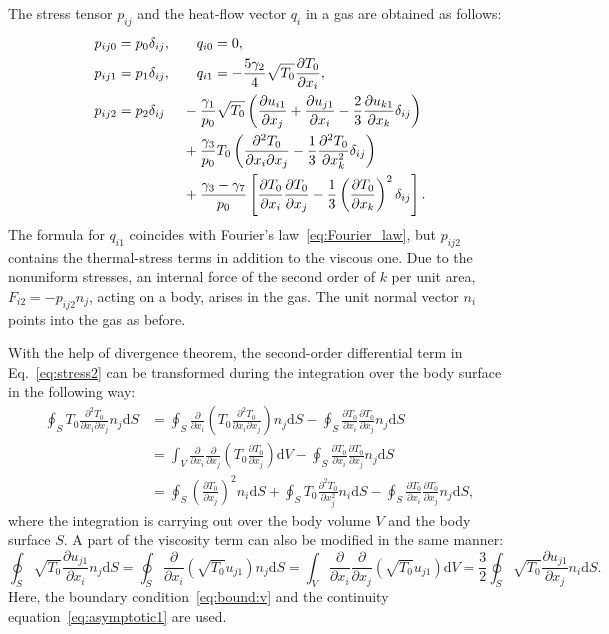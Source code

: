 \documentclass[smallextended, final]{svjour3} %
\newcommand{\dd}{\mathrm{d}}
\newcommand{\pder}[2][]{\frac{\partial#1}{\partial#2}}
\newcommand{\pderdual}[2][]{\frac{\partial^2#1}{\partial#2^2}}
\newcommand{\pderder}[3][]{\frac{\partial^2#1}{\partial#2\partial#3}}
\begin{document}
The stress tensor \(p_{ij}\) and the heat-flow vector \(q_i\) in a gas are obtained as follows:
\begin{alignat}{2}
    p_{ij0} &= p_0\delta_{ij}, && \quad q_{i0} = 0, \label{eq:stress0}\\
    p_{ij1} &= p_1\delta_{ij}, && \quad q_{i1} = -\frac{5\gamma_2}4\sqrt{T_0}\pder[T_0]{x_i}, \label{eq:stress1}\\
    p_{ij2} &= p_2\delta_{ij}
                &&- \frac{\gamma_1}{p_0}\sqrt{T_0}\left(
                \pder[u_{i1}]{x_j} + \pder[u_{j1}]{x_i} - \frac23\pder[u_{k1}]{x_k}\delta_{ij}
            \right) \notag\\
        & &&+ \frac{\gamma_3}{p_0} T_0\left(
                \pderder[T_0]{x_i}{x_j} - \frac13\pderdual[T_0]{x_k}\delta_{ij}
            \right) \notag\\
        & &&+ \frac{\gamma_3 - \gamma_7}{p_0}\left[
                \pder[T_0]{x_i}\pder[T_0]{x_j} - \frac13\left(\pder[T_0]{x_k}\right)^2\delta_{ij}
            \right]. \label{eq:stress2}
\end{alignat}
The formula for \(q_{i1}\) coincides with Fourier's law~\eqref{eq:Fourier_law},
but \(p_{ij2}\) contains the thermal-stress terms in addition to the viscous one.
Due to the nonuniform stresses, an internal force of the second order of \(k\) per unit area,
\(F_{i2} = -p_{ij2}n_j\), acting on a body, arises in the gas.
The unit normal vector \(n_i\) points into the gas as before.

With the help of divergence theorem, the second-order differential term in Eq.~\eqref{eq:stress2}
can be transformed during the integration over the body surface in the following way:
\begin{align*}
    \oint_S T_0\pderder[T_0]{x_i}{x_j} n_j\dd{S}
        &= \oint_S \pder{x_i} \left( T_0\pderder[T_0]{x_i}{x_j} \right) n_j\dd{S}
        - \oint_S \pder[T_0]{x_i}\pder[T_0]{x_j} n_j\dd{S} \\
        &= \int_V \pder{x_i}\pder{x_j} \left( T_0 \pder[T_0]{x_j} \right) \dd{V}
        - \oint_S \pder[T_0]{x_i}\pder[T_0]{x_j} n_j\dd{S} \\
        &= \oint_S \left(\pder[T_0]{x_j}\right)^2 n_i\dd{S}
        + \oint_S T_0\pderdual[T_0]{x_j} n_i\dd{S}
        - \oint_S \pder[T_0]{x_i}\pder[T_0]{x_j} n_j\dd{S},
\end{align*}
where the integration is carrying out over the body volume \(V\) and the body surface \(S\).
A part of the viscosity term can also be modified in the same manner:
\begin{equation*}
    \oint_S \sqrt{T_0}\pder[u_{j1}]{x_i} n_j\dd{S}
        = \oint_S \pder{x_i} \left( \sqrt{T_0} u_{j1} \right) n_j\dd{S}
        = \int_V \pder{x_i}\pder{x_j} \left( \sqrt{T_0} u_{j1} \right) \dd{V}
        = \frac{3}{2}\oint_S \sqrt{T_0} \pder[u_{j1}]{x_j} n_i\dd{S}.
\end{equation*}
Here, the boundary condition~\eqref{eq:bound:v} and the continuity equation~\eqref{eq:asymptotic1} are used.
\end{document}
